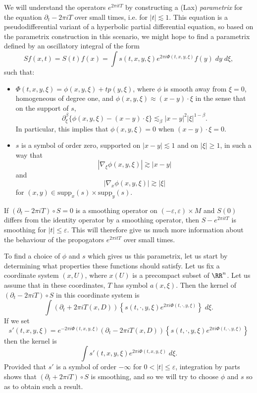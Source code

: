 We will understand the operators $e^{2 \pi i t T}$ by constructing a (Lax) \emph{parametrix} for the equation $\partial_t - 2 \pi i T$ over small times, i.e. for $|t| \lesssim 1$. This equation is a pseudodifferential variant of a hyperbolic partial differential equation, so based on the parametrix construction in this scenario, we might hope to find a parametrix defined by an oscillatory integral of the form
%
\[ Sf(x,t) = S(t)f(x) = \int s(t,x,y,\xi) e^{2 \pi i \Phi(t,x,y,\xi)} f(y)\; dy\; d\xi, \]
%
such that:
%
\begin{itemize}
    \item $\Phi(t,x,y,\xi) = \phi(x,y,\xi) + t p(y,\xi)$, where $\phi$ is smooth away from $\xi = 0$, homogeneous of degree one, and $\phi(x,y,\xi) \approx (x - y) \cdot \xi$ in the sense that on the support of $s$,
    \[ \partial^\beta_\xi \{ \phi(x,y,\xi) - (x - y) \cdot \xi \} \lesssim_\beta |x - y|^2 |\xi|^{1 - \beta}. \]
    In particular, this implies that $\phi(x,y,\xi) = 0$ when $(x - y) \cdot \xi = 0$.

    \item $s$ is a symbol of order zero, supported on $|x - y| \lesssim 1$ and on $|\xi| \geq 1$, in such a way that
    \[ |\nabla_\xi \phi(x,y,\xi)| \gtrsim |x - y| \]
    and
    \[ |\nabla_x \phi(x,y,\xi)| \gtrsim |\xi| \]
    for $(x,y) \in \text{supp}_x(s) \times \text{supp}_y(s)$.
\end{itemize}
%
If $(\partial_t - 2 \pi i T) \circ S = 0$ is a smoothing operator on $(-\varepsilon,\varepsilon) \times M$ and $S(0)$ differs from the identity operator by a smoothing operator, then $S - e^{2 \pi i t T}$ is smoothing for $|t| \leq \varepsilon$. This will therefore give us much more information about the behaviour of the propogators $e^{2 \pi i t T}$ over small times.

To find a choice of $\phi$ and $s$ which gives us this parametrix, let us start by determining what properties these functions should satisfy. Let us fix a coordinate system $(x,U)$, where $x(U)$ is a precompact subset of $\RR^n$. Let us assume that in these coordinates, $T$ has symbol $a(x,\xi)$. Then the kernel of $(\partial_t - 2 \pi i T) \circ S$ in this coordinate system is
%
\[ \int (\partial_t + 2 \pi i T(x,D)) \left\{ s(t,\cdot,y,\xi) e^{2 \pi i \Phi(t,\cdot,y,\xi)} \right\}\; d\xi. \]
%
If we set
%
\[ s'(t,x,y,\xi) = e^{- 2 \pi i \Phi(t,x,y,\xi)} (\partial_t - 2 \pi i T(x,D)) \left\{ s(t,\cdot,y,\xi) e^{2 \pi i \Phi(t,\cdot,y,\xi)} \right\} \]
%
then the kernel is
%
\[ \int s'(t,x,y,\xi) e^{2 \pi i \Phi(t,x,y,\xi)}\; d\xi. \]
%
Provided that $s'$ is a symbol of order $-\infty$ for $0 < |t| \leq \varepsilon$, integration by parts shows that $(\partial_t + 2 \pi i T) \circ S$ is smoothing, and so we will try to choose $\phi$ and $s$ so as to obtain such a result.

